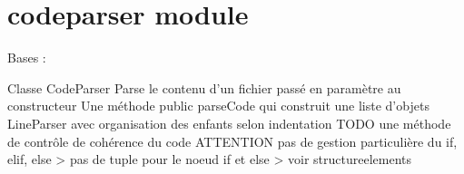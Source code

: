 \documentclass[letterpaper,10pt,french]{sphinxmanual}
\begin{document}
\begin{fulllineitems}
\begin{fulllineitems}
\begin{quote}
\begin{description}
\end{description}\end{quote}

\end{fulllineitems}


\end{fulllineitems}



\section{codeparser module}
\label{\detokenize{codeparser:module-codeparser}}\label{\detokenize{codeparser:codeparser-module}}\label{\detokenize{codeparser::doc}}\label{\detokenize{codeparser:module-codeparser}}

\begin{fulllineitems}
\label{\detokenize{codeparser:codeparser.CodeParser}}
Bases : 

Classe CodeParser
Parse le contenu d’un fichier passé en paramètre au constructeur
Une méthode public parseCode qui construit une liste d’objets LineParser avec organisation des enfants selon indentation
TODO \sphinxhyphen{} une méthode de contrôle de cohérence du code
ATTENTION \sphinxhyphen{} pas de gestion particulière du if, elif, else \sphinxhyphen{}\textgreater{} pas de tuple pour le noeud if et else \textendash{}\textgreater{} voir structureelements

\begin{fulllineitems}
\label{\detokenize{codeparser:codeparser.CodeParser.getFinalStructuredList}}
\end{fulllineitems}


\begin{fulllineitems}
\label{\detokenize{codeparser:codeparser.CodeParser.parseCode}}
\end{fulllineitems}


\end{fulllineitems}
\end{document}
